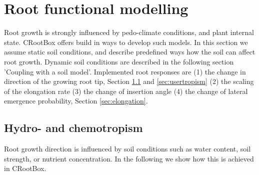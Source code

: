 \documentclass[a4paper]{article}
\begin{document}
\section{Root functional modelling}

Root growth is strongly influenced by pedo-climate conditions, and plant internal state. CRootBox offers build in ways to develop such models. 
In this section we assume static soil conditions, and describe predefined ways how the soil can affect root growth.
Dynamic soil conditions are described in the following section 'Coupling with a soil model'. 
Implemented root responses are (1) the change in direction of the growing root tip, Section \ref{sec:hydro} and \ref{sec:usertropism} 
(2) the scaling of the elongation rate (3) the change of insertion angle (4) the change of lateral emergence probability, Section \ref{sec:elongation}.

\subsection{Hydro- and chemotropism} \label{sec:hydro}

Root growth direction is influenced by soil conditions such as water content, soil strength, or nutrient concentration. 
In the following we show how this is achieved in CRootBox.


\end{document}
